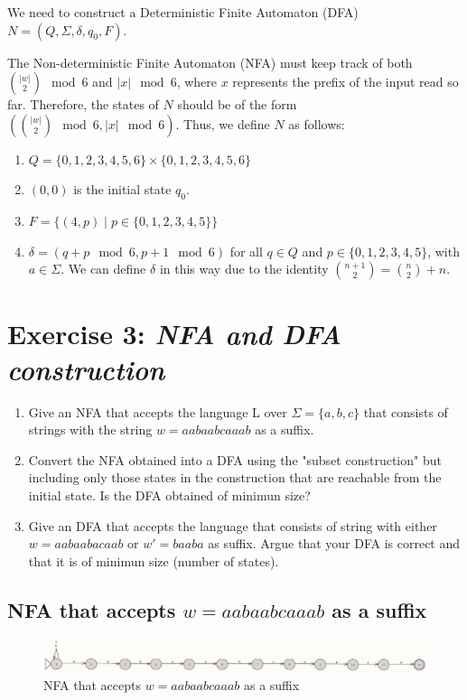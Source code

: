 \documentclass[12pt]{article}
\begin{document}
We need to construct a Deterministic Finite Automaton (DFA) $N = (Q, \Sigma, \delta, q_0, F)$.

The Non-deterministic Finite Automaton (NFA) must keep track of both $\binom{|w|}{2} \mod 6$ and $|x| \mod 6$, where $x$ represents the prefix of the input read so far. Therefore, the states of $N$ should be of the form $(\binom{|w|}{2} \mod 6, |x| \mod 6)$. Thus, we define $N$ as follows:

\begin{enumerate}
    \item $Q = \{0, 1, 2, 3, 4, 5, 6\} \times \{0, 1, 2, 3, 4, 5, 6\}$
    \item $(0, 0)$ is the initial state $q_0$.
    \item $F = \{(4, p) \mid p \in \{0, 1, 2, 3, 4, 5\}\}$
    \item $\delta = (q + p \mod 6, p + 1 \mod 6)$ for all $q \in Q$ and $p \in \{0, 1, 2, 3, 4, 5\}$, with $a \in \Sigma$. We can define $\delta$ in this way due to the identity $\binom{n+1}{2} = \binom{n}{2} + n$.
\end{enumerate}


\section{Exercise 3: \textit{NFA and DFA construction}}
\begin{enumerate}
[label=\alph*)]
    \item Give an NFA that accepts the language L over $\Sigma = \{ a, b, c \}$ that consists of strings with the string $w = aabaabcaaab$ as a suffix.
    \item Convert the NFA obtained into a DFA using the "subset construction" but including only those states in the construction that are reachable from the initial state. Is the DFA obtained of minimun size?
    \item Give an DFA that accepts the language that consists of string with either $w = aabaabacaab$ or $w' = baaba$ as suffix. Argue that your DFA is correct and that it is of minimun size (number of states).
\end{enumerate}

\subsection{NFA that accepts $w = aabaabcaaab$ as a suffix}
\begin{figure}[h]
    \centering
    \includegraphics[width=1\linewidth]{Tarea 2 NFA 3.a.jpg}
    \caption{NFA that accepts $w = aabaabcaaab$ as a suffix}
    \label{NFA 1}
\end{figure}
\end{document}
